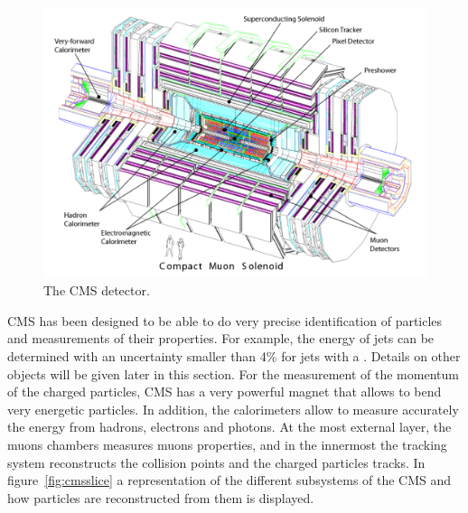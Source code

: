\begin{figure}[!Hhtbp]
  \begin{center}
    \includegraphics[width=\textwidth]{figs/CMS_det.pdf}
    \caption{The CMS detector.}
    \label{fig:cmsdet}
  \end{center}
\end{figure}

CMS has been designed to be able to do very precise identification of particles and measurements of their properties. For example, the energy of jets can be determined with an uncertainty smaller than 4\% for jets with a . Details on other objects will be given later in this section. For the measurement of the momentum of the charged particles, CMS has a very powerful magnet that allows to bend very energetic particles. In addition, the calorimeters allow to measure accurately the energy from hadrons, electrons and photons. At the most external layer, the muons chambers measures muons properties, and in the innermost the tracking system reconstructs the collision points and the charged particles tracks. In figure~\ref{fig:cmsslice} a representation of the different subsystems of the CMS and how particles are reconstructed from them is displayed.

